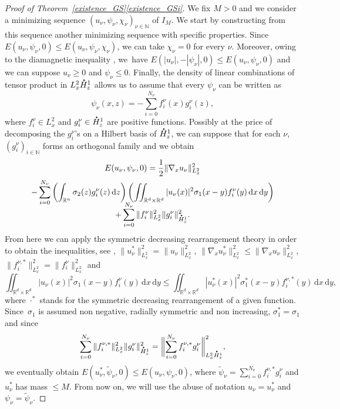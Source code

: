 \documentclass[JEP,XML,SOM,NoEqCountersInSection,NoFloatCountersInSection,Unicode,published]{cedram}
\theoremstyle{definition}
\newcommand*{\overbigdot}[1]{%
\accentset{\mbox{\large\bfseries .}}{#1}}
\newenvironment{ProofOf}[1]{\begin{proof}[Proof of #1]}{\end{proof}}
\newcommand{\R}{\mathbb{R}}
\newcommand{\ud}{\, {\mathrm{d}}}
\begin{document}
\begin{ProofOf}{Theorem~\ref{existence_GS}\eqref{existence_GSi}}
We fix $M>0$ and we consider a minimizing sequence $(u_{\nu},\psi_{\nu},\chi_{\nu})_{\nu\in\mathbb N}$ of $I_{M}$. We start by constructing from this sequence another minimizing sequence with specific properties. Since $E(u_{\nu},\psi_{\nu},0)\leq E(u_{\nu},\psi_{\nu},\chi_{\nu})$, we can take $\chi_{\nu}=0$ for every $\nu$. Moreover, owing to
the diamagnetic inequality \cite[Th.\,7.21]{LL}, we~have
$E(|u_{\nu}|,-|\psi_{\nu}|,0)\leq E(u_{\nu},\psi_{\nu},0)$ and we can suppose $u_{\nu}\geq 0$ and $\psi_{\nu}\leq 0$. Finally, the density of linear combinations of tensor product in $L_{x}^{2}\overbigdot{H}_{z}^{1}$ allows us to assume that every $\psi_{\nu}$ can be written as\vspace*{-3pt}
\[
\psi_{\nu}(x,z)=-\sum\limits_{i=0}^{N_{\nu}}f_{i}^{\nu}(x)g_{i}^{\nu}(z),
\]
where $f_{i}^{\nu}\in L_{x}^{2}$ and $g_{i}^{\nu}\in\overbigdot{H}_{z}^{1}$ are positive functions.
Possibly at the price of decomposing the
$g_{i}^{\nu}$'s on a Hilbert basis of $\overbigdot{H}_{z}^{1}$, we can suppose that for each $\nu$, $(g_{i}^{\nu})_{i\in \mathbb N}$ forms an orthogonal family and we obtain\vspace*{-8pt}
\begin{multline*}
E(u_{\nu},\psi_{\nu},0)=\frac{1}{2}\|\nabla_{x}u_{\nu}\|_{L_{x}^{2}}^{2}\\
-\sum\limits_{i=0}^{N_{\nu}}\left(\int_{\R^{n}}\sigma_{2}(z)g_{i}^{\nu}(z)\ud z\right)\left(\iint_{\R^{d}\times\R^{d}}|u_{\nu}(x)|^{2}\sigma_{1}(x-y)f_{i}^{\nu}(y)\ud x\ud y\right)\\[
-8pt]
+\sum\limits_{i=0}^{N_{\nu}}\|f_{i}^{\nu}\|_{L_{x}^{2}}^{2}\|g_{i}^{\nu}\|_{\overbigdot{H}_{z}^{1}}^{2}.
\end{multline*}
From here we can apply the symmetric decreasing rearrangement theory in order to obtain the inequalities, see \cite[Chap.\,3]{LL}, $\|u_{\nu}^{*}\|_{L_{x}^{2}}^{2}=\|u_{\nu}\|_{L_{x}^{2}}^{2}$,
$\|\nabla_{x}u_{\nu}^{*}\|_{L_{x}^{2}}^{2}\leq\|\nabla_{x}u_{\nu}\|_{L_{x}^{2}}^{2}$, $\|f_{i}^{\nu,*}\|_{L_{x}^{2}}^{2}=\|f_{i}^{\nu}\|_{L_{x}^{2}}^{2}$ and\vspace*{-3pt}
\[
\iint_{\R^{d}\times\R^{d}}|u_{\nu}(x)|^{2}\sigma_{1}(x-y)f_{i}^{\nu}(y)\ud x\ud y\leq \iint_{\R^{d}\times\R^{d}}|u_{\nu}^{*}(x)|^{2}\sigma_{1}^{*}(x-y)f_{i}^{\nu,*}(y)\ud x\ud y,
\]
where $\cdot^{*}$ stands for the symmetric decreasing rearrangement of a given function. Since~$\sigma_{1}$ is assumed non negative, radially symmetric and non increasing, $\sigma_{1}^{*}=\sigma_{1}$ and since\vspace*{-5pt}
\[
\sum\limits_{i=0}^{N_{\nu}}\|f_{i}^{\nu,*}\|_{L_{x}^{2}}^{2}\|g_{i}^{\nu}\|_{\overbigdot{H}_{z}^{1}}^{2}=\biggl\|\sum\limits_{i=0}^{N_{\nu}}f_{i}^{\nu,*}g_{i}^{\nu}\biggr\|_{L_{x}^{2}\overbigdot{H}_{z}^{1}}^{2},
\]
we eventually obtain $E(u_{\nu}^{*},\widetilde{\psi}_{\nu},0)\leq E(u_{\nu},\psi_{\nu},0)$,
where $\widetilde{\psi}_{\nu}=\sum_{i=0}^{N_{\nu}}f_{i}^{\nu,*}g_{i}^{\nu}$
and $u_{\nu}^{*}$ has mass $\leq M$. From now on, we will use the abuse of notation $u_{\nu}=u_{\nu}^{*}$ and $\psi_{\nu}=\widetilde{\psi}_{\nu}$.


\end{ProofOf}
\end{document}
